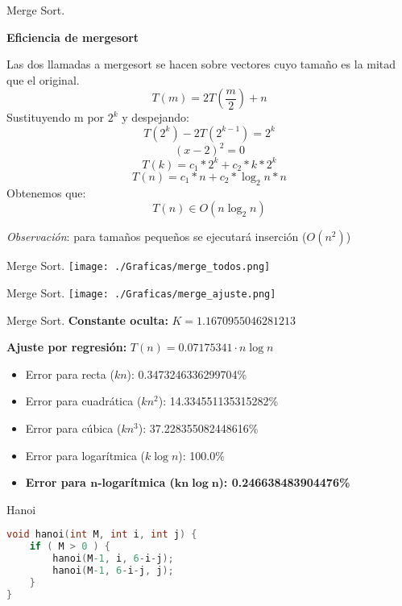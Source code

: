 \documentclass[10pt, xcolor=table]{beamer}
\begin{document}
\begin{frame}[fragile]{Merge Sort. 
}
\begin{center}
\textbf{\large{Eficiencia de mergesort}}
\end{center}
Las dos llamadas a mergesort se hacen sobre vectores cuyo tamaño es la mitad que el original. $$T(m) = 2T\left(\frac{m}{2}\right)+n$$ Sustituyendo m por $2^k$ y despejando: $$T(2^k)-2T(2^{k-1}) = 2^k$$ $$(x-2)^2 = 0$$ $$T(k) = c_1*2^k + c_2*k*2^k$$ $$T(n)=c_1*n+c_2*\log_2{n}*n$$ Obtenemos que: $$T(n) \in O(n\log_2{n})$$

\small{\textit{Observación}: para tamaños pequeños se ejecutará inserción ($O(n^2)$) }

\end{frame}

\begin{frame}[fragile]{Merge Sort. 
}
\texttt{[image: ./Graficas/merge\_todos.png]}
\end{frame}

\begin{frame}[fragile]{Merge Sort. 
}
\texttt{[image: ./Graficas/merge\_ajuste.png]}
\end{frame}

\begin{frame}[fragile]{Merge Sort. 
	}
\textbf{Constante oculta:} $K=1.1670955046281213$

\textbf{Ajuste por regresión:} $T(n)=0.07175341\cdot n\log n$
\begin{itemize}
	\item Error para recta ($kn$): 0.3473246336299704\%
	\item Error para cuadrática ($kn^2$): 14.334551135315282\%
	\item Error para cúbica ($kn^3$): 37.228355082448616\%
	\item Error para logarítmica ($k\log n$): 100.0\%
	\item \textbf{Error para $\boldsymbol{n}$-logarítmica ($\boldsymbol{kn\log n}$): 0.246638483904476\%}
\end{itemize}
\end{frame}

\begin{frame}[fragile]{Hanoi}
\begin{lstlisting}[language=C]
void hanoi(int M, int i, int j) {
	if ( M > 0 ) {
		hanoi(M-1, i, 6-i-j);
		hanoi(M-1, 6-i-j, j);
	}
}
\end{lstlisting}
\end{frame}
\end{document}
